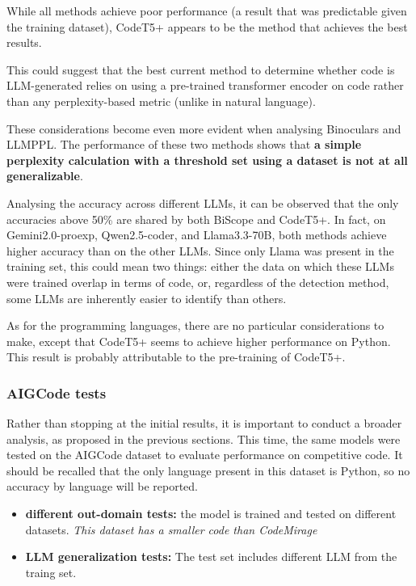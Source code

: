 While all methods achieve 
poor performance (a result that was predictable given the training dataset), 
CodeT5+ appears to be the method that achieves the best results. 

This could suggest that the best current method to determine whether code is 
LLM-generated relies on using a pre-trained transformer encoder on code rather 
than any perplexity-based metric (unlike in natural language).

These considerations become even more evident when analysing Binoculars and LLMPPL. 
The performance of these two methods shows that \textbf{a simple perplexity calculation with a 
threshold set using a dataset is not at all generalizable}.

Analysing the accuracy across different LLMs, it can be observed that the only 
accuracies above 50\% are shared by both BiScope and CodeT5+. In fact, on Gemini2.0-proexp, 
Qwen2.5-coder, and Llama3.3-70B, both methods achieve higher accuracy than on the other 
LLMs. Since only Llama was present in the training set, this could mean two things: 
either the data on which these LLMs were trained overlap in terms of code, or, 
regardless of the detection method, some LLMs are inherently easier to identify than others.

As for the programming languages, there are no particular considerations to make, 
except that CodeT5+ seems to achieve higher performance on Python. This result is 
probably attributable to the pre-training of CodeT5+.


\clearpage
\subsubsection{AIGCode tests}
Rather than stopping at the initial results, it is important to conduct a broader analysis, 
as proposed in the previous sections. 
This time, the same models were tested on the AIGCode dataset to evaluate performance on competitive code.
It should be recalled that the only language present in this dataset is Python, so no accuracy by language will be reported.
\begin{itemize}
\item \textbf{different out-domain tests:} the model is trained and tested on different datasets. \textit{This dataset has a smaller code than CodeMirage}
\item \textbf{LLM generalization tests:} The test set includes different LLM from the traing set.
\end{itemize}

